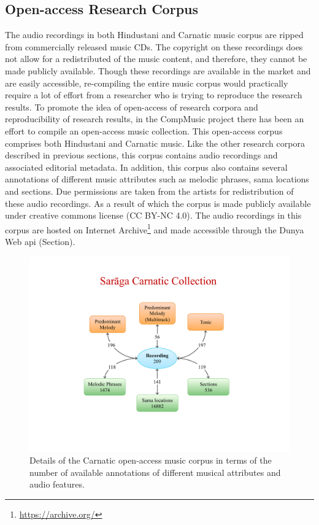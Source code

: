 \subsection{Open-access Research Corpus}
\label{sec:corpus_open_access_research_corpus}

The audio recordings in both Hindustani and Carnatic music corpus are ripped from commercially released music CDs. The copyright on these recordings does not allow for a redistributed of the music content, and therefore, they cannot be made publicly available. Though these recordings are available in the market and are easily accessible, re-compiling the entire music corpus would practically require a lot of effort from a researcher who is trying to reproduce the research results. To promote the idea of open-access of research corpora and reproducibility of research results, in the CompMusic project there has been an effort to compile an open-access music collection. This open-access corpus comprises both Hindustani and Carnatic music. Like the other research corpora described in previous sections, this corpus contains audio recordings and associated editorial metadata. In addition, this corpus also contains several annotations of different music attributes such as melodic phrases, sama locations and sections. Due permissions are taken from the artists for redistribution of these audio recordings. As a result of which the corpus is made publicly available under creative commons license (CC BY-NC 4.0). The audio recordings in this corpus are hosted on Internet Archive\footnote{\url{https://archive.org/}} and made accessible through the Dunya Web \gls{api} (Section). 


\begin{figure}
	\begin{center}
		\includegraphics[width=\figSizeNinety]{ch04_datasets/figures/carnatic_CC_details.pdf}
	\end{center}
	\caption[Details of the Carnatic open-access music corpus]{Details of the Carnatic open-access music corpus in terms of the number of available annotations of different musical attributes and audio features.}
	\label{fig:carnatic_open_access_corpus_details}
\end{figure}

